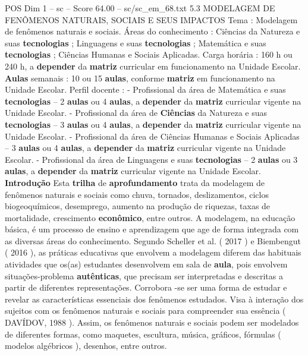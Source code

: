 \begin{textsample}{POS Dim 1 – sc – Score 64.00 – sc/sc\_em\_68.txt}  \label{ex:f1_pos_014}
5.3 MODELAGEM DE FENÔMENOS NATURAIS, SOCIAIS E SEUS IMPACTOS Tema : Modelagem de fenômenos naturais e sociais.
Áreas do conhecimento : Ciências da Natureza e suas \textbf{tecnologias} ; Linguagens e suas \textbf{tecnologias} ; Matemática e suas \textbf{tecnologias} ; Ciências Humanas e Sociais Aplicadas.
Carga horária : 160 h ou 240 h, a \textbf{depender} da \textbf{matriz} curricular em funcionamento na Unidade Escolar. \textbf{Aulas} semanais : 10 ou 15 \textbf{aulas}, conforme \textbf{matriz} em funcionamento na Unidade Escolar.
Perfil docente : - Profissional da área de Matemática e suas \textbf{tecnologias} – 2 \textbf{aulas} ou 4 \textbf{aulas}, a \textbf{depender} da \textbf{matriz} curricular vigente na Unidade Escolar. - Profissional da área de \textbf{Ciências} da Natureza e suas \textbf{tecnologias} – 3 \textbf{aulas} ou 4 \textbf{aulas}, a \textbf{depender} da \textbf{matriz} curricular vigente na Unidade Escolar. - Profissional da área de Ciências Humanas e Sociais Aplicadas – 3 \textbf{aulas} ou 4 \textbf{aulas}, a \textbf{depender} da \textbf{matriz} curricular vigente na Unidade Escolar. - Profissional da área de Linguagens e suas \textbf{tecnologias} – 2 \textbf{aulas} ou 3 \textbf{aulas}, a \textbf{depender} da \textbf{matriz} curricular vigente na Unidade Escolar. \textbf{Introdução} Esta \textbf{trilha} de \textbf{aprofundamento} trata da modelagem de fenômenos naturais e sociais como chuva, tornados, deslizamentos, ciclos biogeoquímicos, desemprego, aumento na produção de riquezas, taxas de mortalidade, crescimento \textbf{econômico}, entre outros.
A modelagem, na educação básica, é um processo de ensino e aprendizagem que age de forma integrada com as diversas áreas do conhecimento.
Segundo Scheller et al. ( 2017 ) e Biembengut ( 2016 ), as práticas educativas que envolvem a modelagem diferem das habituais atividades que os(as) estudantes desenvolvem em sala de \textbf{aula}, pois envolvem situações-problema \textbf{autênticas}, que precisam ser interpretadas e descritas a partir de diferentes representações.
Corrobora -se ser uma forma de estudar e revelar as características essenciais dos fenômenos estudados.
Visa à interação dos sujeitos com os fenômenos naturais e sociais para compreender sua essência ( DAVÍDOV, 1988 ).
Assim, os fenômenos naturais e sociais podem ser modelados de diferentes formas, como maquetes, escultura, música, gráficos, fórmulas ( modelos algébricos ), desenhos, entre outros.

\end{textsample}
